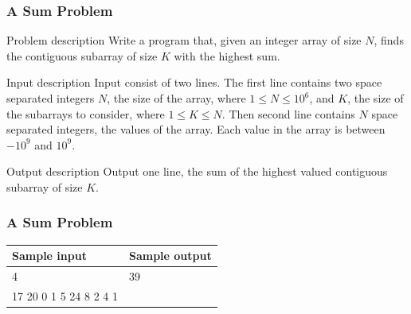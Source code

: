 \documentclass{beamer}
\begin{document}
\begin{frame}[plain]
	\frametitle{A Sum Problem}
	\begin{block}{Problem description}
    	    Write a program that, given an integer array of size $N$, finds the
            contiguous subarray of size $K$ with the highest sum.
    \end{block}

    \vspace{10pt}
    
    \begin{block}{Input description}
            Input consist of two lines.
            The first line contains two space separated integers $N$, the size of the array, where $1 \leq N \leq 10^6$,
    and $K$, the size of the subarrays to consider, where $1 \leq K \leq N$.
            Then second line contains $N$ space separated integers, the values of the array.
            Each value in the array is between $-10^9$  and $10^9$.
    \end{block}

    \vspace{10pt}
    
    \begin{block}{Output description}
            Output one line, the sum of the highest valued contiguous subarray of size $K$.
    \end{block}
\end{frame}

\begin{frame}[plain]
	\frametitle{A Sum Problem}
	\begin{center}
		\begin{tabular}{|l|l|}
            \hline
            {\footnotesize Sample input} & {\footnotesize Sample output} \\
            \hline
            \ttfamily
            10 4 & 39 \\
            17 20 0 1 5 24 8 2 4 1 &  \\
            \hline
        \end{tabular}
    \end{center}
\end{frame}
\end{document}
